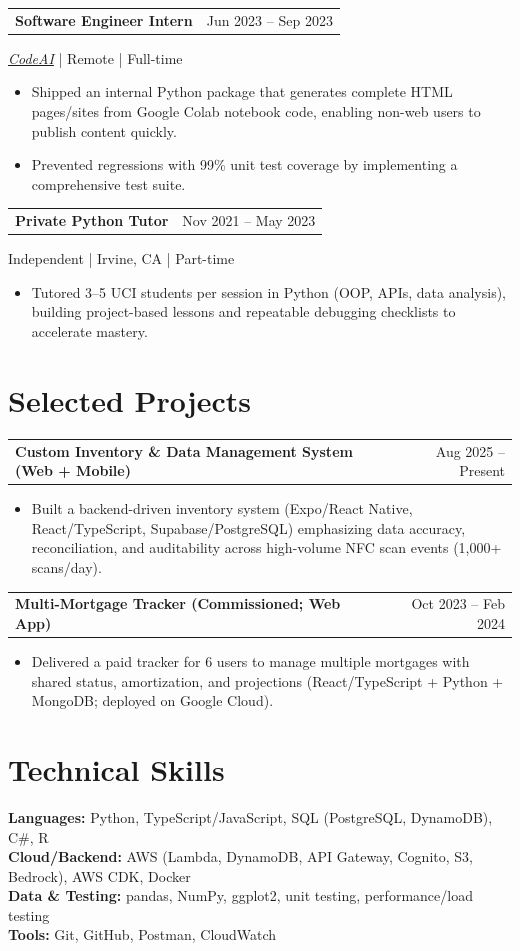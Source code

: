 \documentclass[11pt]{article}
\makeatletter
\newcommand{\twocol}[2]{%
  \noindent\begin{tabularx}{\textwidth}{@{}X r@{}}
    #1 & #2 \\
  \end{tabularx}\par
}
\newcommand{\roleblock}[5]{%
  \twocol{\textbf{#1}}{\textcolor{meta}{#2}}%
  {\textcolor{meta}{#3 \;|\; #4 \;|\; #5}}\par
}
\newcommand{\projectblock}[2]{%
  \twocol{\textbf{#1}}{\textcolor{meta}{#2}}%
}
\newenvironment{resumeItemize}{%
  \begin{itemize}[leftmargin=*, topsep=1pt, itemsep=0pt, parsep=0pt, partopsep=0pt]%
}{%
  \end{itemize}%
}
\makeatother
\begin{document}
\roleblock{Software Engineer Intern}{Jun 2023 -- Sep 2023}{\href{https://www.code-ai.org/team.html}{\textit{CodeAI}}}{Remote}{Full-time}
\begin{resumeItemize}
  \item Shipped an internal Python package that generates complete HTML pages/sites from Google Colab notebook code, enabling non-web users to publish content quickly.
  \item Prevented regressions with 99\% unit test coverage by implementing a comprehensive test suite.
\end{resumeItemize}
\vspace{3pt}

\roleblock{Private Python Tutor}{Nov 2021 -- May 2023}{Independent}{Irvine, CA}{Part-time}
\begin{resumeItemize}
  \item Tutored 3--5 UCI students per session in Python (OOP, APIs, data analysis), building project-based lessons and repeatable debugging checklists to accelerate mastery.
\end{resumeItemize}

\section{Selected Projects}

\projectblock{Custom Inventory \& Data Management System (Web + Mobile)}{Aug 2025 -- Present}
\begin{resumeItemize}
  \item Built a backend-driven inventory system (Expo/React Native, React/TypeScript, Supabase/PostgreSQL) emphasizing data accuracy, reconciliation, and auditability across high-volume NFC scan events (1,000+ scans/day).
\end{resumeItemize}
\vspace{2pt}

\projectblock{Multi-Mortgage Tracker (Commissioned; Web App)}{Oct 2023 -- Feb 2024}
\begin{resumeItemize}
  \item Delivered a paid tracker for 6 users to manage multiple mortgages with shared status, amortization, and projections (React/TypeScript + Python + MongoDB; deployed on Google Cloud).
\end{resumeItemize}

\section{Technical Skills}
\textbf{Languages:} Python, TypeScript/JavaScript, SQL (PostgreSQL, DynamoDB), C\#, R \\
\textbf{Cloud/Backend:} AWS (Lambda, DynamoDB, API Gateway, Cognito, S3, Bedrock), AWS CDK, Docker \\
\textbf{Data \& Testing:} pandas, NumPy, ggplot2, unit testing, performance/load testing \\
\textbf{Tools:} Git, GitHub, Postman, CloudWatch
\end{document}

